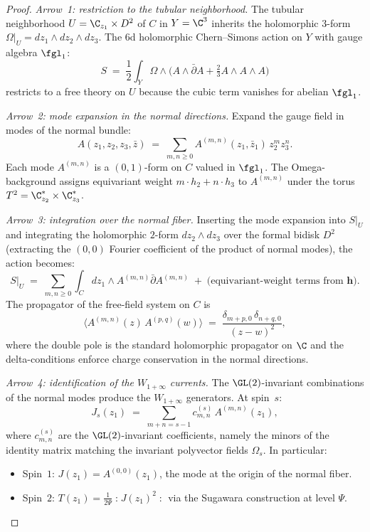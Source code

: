 \begin{proof}
\emph{Arrow~1: restriction to the tubular neighborhood.}
The tubular neighborhood $U = \C_{z_1} \times D^2$ of $C$ in $Y = \C^3$ inherits the holomorphic $3$-form $\Omega|_U = dz_1 \wedge dz_2 \wedge dz_3$. The 6d holomorphic Chern--Simons action on $Y$ with gauge algebra $\fgl_1$:
\[
 S \;=\; \frac{1}{2}\int_Y \Omega \wedge \bigl(A \wedge \bar{\partial} A + \tfrac{2}{3}A \wedge A \wedge A\bigr)
\]
restricts to a free theory on $U$ because the cubic term vanishes for abelian $\fgl_1$.

\emph{Arrow~2: mode expansion in the normal directions.}
Expand the gauge field in modes of the normal bundle:
\[
 A(z_1, z_2, z_3, \bar{z}) \;=\; \sum_{m, n \geq 0} A^{(m,n)}(z_1, \bar{z}_1)\, z_2^m z_3^n.
\]
Each mode $A^{(m,n)}$ is a $(0,1)$-form on $C$ valued in $\fgl_1$. The Omega-background assigns equivariant weight $m \cdot h_2 + n \cdot h_3$ to $A^{(m,n)}$ under the torus $T^2 = \C^*_{z_2} \times \C^*_{z_3}$.

\emph{Arrow~3: integration over the normal fiber.}
Inserting the mode expansion into $S|_U$ and integrating the holomorphic $2$-form $dz_2 \wedge dz_3$ over the formal bidisk $D^2$ (extracting the $(0,0)$ Fourier coefficient of the product of normal modes), the action becomes:
\[
 S|_U \;=\; \sum_{m,n \geq 0} \int_C dz_1 \wedge A^{(m,n)} \bar{\partial} A^{(m,n)} \;+\; \text{(equivariant-weight terms from } \boldsymbol{h}\text{)}.
\]
The propagator of the free-field system on $C$ is
\[
 \langle A^{(m,n)}(z) \, A^{(p,q)}(w) \rangle
 \;=\; \frac{\delta_{m+p,0}\,\delta_{n+q,0}}{(z - w)^2},
\]
where the double pole is the standard holomorphic propagator on $\C$ and the delta-conditions enforce charge conservation in the normal directions.

\emph{Arrow~4: identification of the $W_{1+\infty}$ currents.}
The $\GL(2)$-invariant combinations of the normal modes produce the $W_{1+\infty}$ generators. At spin~$s$:
\[
 J_s(z_1) \;=\; \sum_{m+n = s-1} c_{m,n}^{(s)} \, A^{(m,n)}(z_1),
\]
where $c_{m,n}^{(s)}$ are the $\GL(2)$-invariant coefficients, namely
the minors of the identity matrix matching the invariant polyvector
fields \(\Omega_s\). In particular:
\begin{itemize}
 \item Spin~$1$: $J(z_1) = A^{(0,0)}(z_1)$, the mode at the origin of the normal fiber.
 \item Spin~$2$: $T(z_1) = \frac{1}{2\Psi}\mathopen{:}J(z_1)^2\mathclose{:}$ via the Sugawara construction at level $\Psi$.
\end{itemize}


\end{proof}
